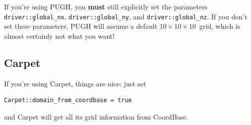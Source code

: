 If you're using PUGH, you \textbf{must} still explicitly set the
parameters \verb|driver::global_nx|, \verb|driver::global_ny|,
and \verb|driver::global_nz|.  If you don't set these parameters,
PUGH will assume a default $10 \times 10 \times 10$~grid, which is
almost certainly not what you want!

\subsection{Carpet}

If you're using Carpet, things are nice:  just set
\begin{verbatim}
Carpet::domain_from_coordbase = true
\end{verbatim}
and Carpet will get all its grid information from CoordBase.



